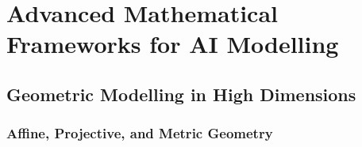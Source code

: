 \documentclass[
]{article}
\begin{document}
\section{Advanced Mathematical Frameworks for AI
Modelling}\label{advanced-mathematical-frameworks-for-ai-modelling}

\subsection{Geometric Modelling in High
Dimensions}\label{geometric-modelling-in-high-dimensions}

\subsubsection{Affine, Projective, and Metric
Geometry}\label{affine-projective-and-metric-geometry}
\end{document}

